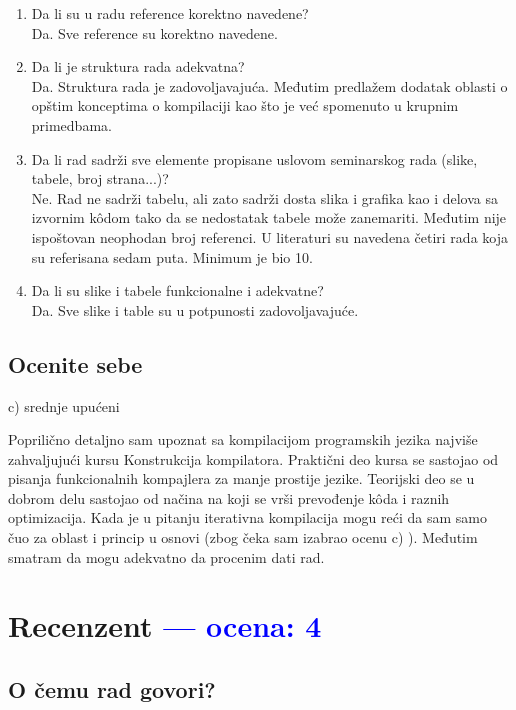 \documentclass[a4paper]{report}
\newcommand{\odgovor}[1]{\textcolor{blue}{#1}}
\begin{document}
\begin{enumerate}
\item Da li su u radu reference korektno navedene?\\
Da. Sve reference su korektno navedene.
\item Da li je struktura rada adekvatna?\\
Da. Struktura rada je zadovoljavajuća. Međutim predlažem dodatak oblasti o opštim konceptima o kompilaciji kao što je već spomenuto u krupnim primedbama.
\item Da li rad sadrži sve elemente propisane uslovom seminarskog rada (slike, tabele, broj strana...)?\\
Ne. Rad ne sadrži tabelu, ali zato sadrži dosta slika i grafika kao i delova sa izvornim kôdom tako da se nedostatak tabele može zanemariti. Međutim nije ispoštovan neophodan broj referenci. U literaturi su navedena četiri rada koja su referisana sedam puta. Minimum je bio 10.
\item Da li su slike i tabele funkcionalne i adekvatne?\\
Da. Sve slike i table su u potpunosti zadovoljavajuće.
\end{enumerate}

\section{Ocenite sebe}
c) srednje upućeni

Poprilično detaljno sam upoznat sa kompilacijom programskih jezika najviše zahvaljujući kursu Konstrukcija kompilatora. Praktični deo kursa se sastojao od pisanja funkcionalnih kompajlera za manje prostije jezike. Teorijski deo se u dobrom delu sastojao od načina na koji se vrši prevođenje kôda i raznih optimizacija. Kada je u pitanju iterativna kompilacija mogu reći da sam samo čuo za oblast i princip u osnovi (zbog čeka sam izabrao ocenu c) ). Međutim smatram da mogu adekvatno da procenim dati rad.



\chapter{Recenzent \odgovor{--- ocena: 4} }


\section{O čemu rad govori?}
\end{document}
